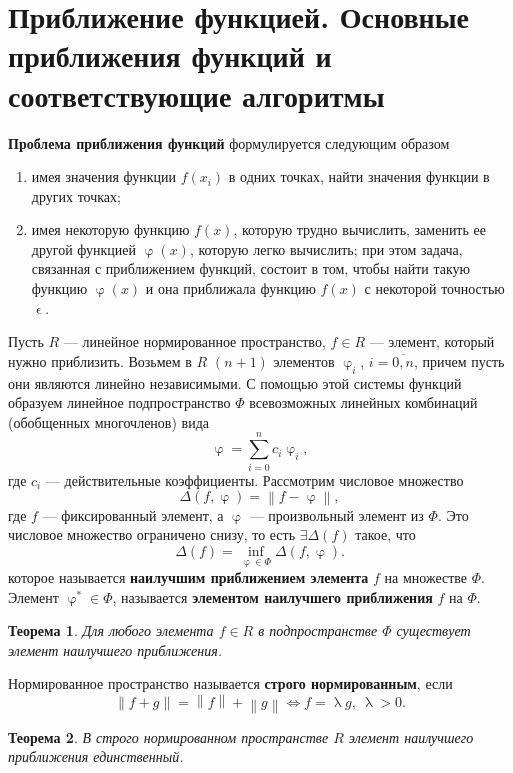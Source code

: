 \documentclass[a4paper, 12pt]{report}
\numberwithin{equation}{section}
\renewcommand{\varphi}{\upvarphi}
\renewcommand{\lambda}{\uplambda}
\renewcommand{\varepsilon}{\upvarepsilon}
\newcommand\Norm[1]{\left\| #1 \right\|}
\newtheorem*{theorem}{Теорема}
\begin{document}
	\section{Приближение функцией. Основные приближения функций и соответствующие алгоритмы}
	\textbf{Проблема приближения функций} формулируется следующим образом \begin{enumerate}
		\item {имея значения функции $f(x_i)$ в одних точках, найти значения функции в других точках;}
		\item {имея некоторую функцию $f(x)$, которую трудно вычислить, заменить ее другой функцией $\varphi(x)$, которую легко вычислить; при этом задача, связанная с приближением функций, состоит в том, чтобы найти такую функцию $\varphi(x)$ и она приближала функцию $f(x)$ с некоторой точностью $\varepsilon$.}
	\end{enumerate}
	Пусть $R$ --- линейное нормированное пространство, $f\in R$ --- элемент, который нужно приблизить. Возьмем в $R$ $(n+1)$ элементов $\varphi_i$, $i=\overline{0,n}$, причем пусть они являются линейно независимыми. С помощью этой системы функций образуем линейное подпространство $\Phi$ всевозможных линейных комбинаций (обобщенных многочленов) вида \begin{equation}
		\varphi = \sum_{i=0}^n c_i\varphi_i,
	\end{equation}
	где $c_i$ --- действительные коэффициенты. Рассмотрим числовое множество 
	\begin{equation}
		\Delta (f,\varphi) = \Norm{f - \varphi},
	\end{equation} где $f$ --- фиксированный элемент, а $\varphi$ --- произвольный элемент из $\Phi$. Это числовое множество ограничено снизу, то есть $\exists \Delta (f)$ такое, что
	\begin{equation}
		\Delta (f) = \underset{\varphi \in \Phi}{\inf} \Delta (f,\varphi).
	\end{equation}
	которое называется \textbf{наилучшим приближением элемента} $f$ на множестве $\Phi$. Элемент $\varphi^*\in \Phi$, называется \textbf{элементом наилучшего приближения} $f$ на $\Phi$.
	\begin{theorem}
		Для любого элемента $f \in R$ в подпространстве $\Phi$ существует элемент наилучшего приближения.
	\end{theorem}
	\noindent
	Нормированное пространство называется \textbf{строго нормированным}, если $$\Norm{f+g} = \Norm{f} + \Norm{g} \Longleftrightarrow f = \lambda g,\ \lambda > 0.$$
	\begin{theorem}
		В строго нормированном пространстве $R$ элемент наилучшего приближения единственный.
	\end{theorem}
\end{document}
